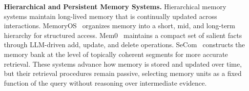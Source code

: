 \textbf{Hierarchical and Persistent Memory Systems.}
Hierarchical memory systems maintain long-lived memory that is continually
updated across interactions. MemoryOS~\cite{DBLP:journals/corr/abs-2506-06326}
organizes memory into a short, mid, and long-term hierarchy for structured
access. Mem0~\cite{DBLP:journals/corr/abs-2504-19413} maintains a compact set of
salient facts through LLM-driven add, update, and delete operations.
SeCom~\cite{pan2025secom} constructs the memory bank at the level of topically coherent segments for more accurate retrieval.  These systems advance how
memory is stored and updated over time, but their retrieval procedures remain
passive, selecting memory units as a fixed function of the query without
reasoning over intermediate evidence.

